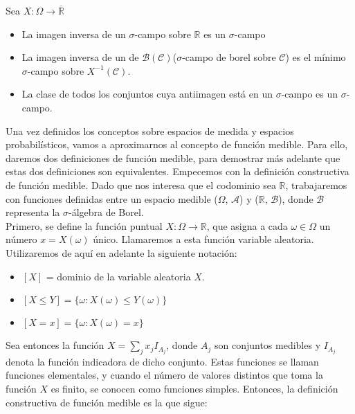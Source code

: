 \begin{lemma}
  Sea $X: \Omega \to \overline{\mathbb{R}}$
  \begin{itemize}
    \item La imagen inversa de un $\sigma$-campo sobre $\mathbb{R}$ es un $\sigma$-campo
    \item La imagen inversa de un de $\mathcal{B}(\mathcal{C})$($\sigma$-campo de borel sobre $\mathcal{C}$) es el mínimo $\sigma$-campo sobre $X^{-1}(\mathcal{C})$.
    \item La clase de todos los conjuntos cuya antiimagen está en un $\sigma$-campo es un $\sigma$-campo.
  \end{itemize}
\end{lemma}

Una vez definidos los conceptos sobre espacios de medida y espacios probabilísticos, vamos a aproximarnos al concepto de función medible. Para ello, daremos dos definiciones de función medible, para demostrar más adelante que estas dos definiciones son equivalentes. Empecemos con la definición constructiva de función medible. Dado que nos interesa que el codominio sea $\mathbb{R}$, trabajaremos con funciones definidas entre un espacio medible ($\Omega$, $\mathcal{A}$) y ($\mathbb{R}$, $\mathcal{B}$), donde $\mathcal{B}$ representa la $\sigma$-álgebra de Borel.\\

Primero, se define la función puntual $X: \Omega \to \mathbb{R}$, que asigna a cada $\omega \in \Omega$ un número $x = X(\omega)$ único. Llamaremos a esta función variable aleatoria. Utilizaremos de aquí en adelante la siguiente notación:

\begin{itemize}
\item $[X]$ = dominio de la variable aleatoria $X$.
\item $[ X \leq Y] = \{\omega: X(\omega) \leq Y(\omega)\}$
\item $[ X = x] = \{\omega: X(\omega)= x\}$
\end{itemize}

Sea entonces la función $X = \displaystyle \sum_j x_jI_{A_j}$, donde $A_j$ son conjuntos medibles y $I_{A_j}$ denota la función indicadora de dicho conjunto. Estas funciones se llaman funciones elementales, y cuando el número de valores distintos que toma la función $X$ es finito, se conocen como funciones simples. Entonces, la definición constructiva de función medible es la que sigue:\\

